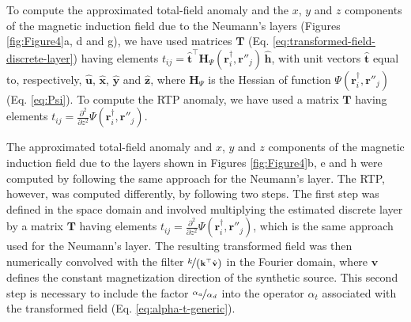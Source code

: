 To compute the approximated total-field anomaly and the $x$, $y$ and $z$ components of the magnetic induction field 
due to the Neumann's layers (Figures \ref{fig:Figure4}a, d and g), 
we have used matrices $\mathbf{T}$ (Eq. \ref{eq:transformed-field-discrete-layer}) 
having elements $t_{ij} = \hat{\mathbf{t}}^{\top} \mathbf{H}_{\Psi}(\mathbf{r}^{\dagger}_{i}, \mathbf{r}''_{j}) \, \hat{\mathbf{h}}$,
with unit vectors $\hat{\mathbf{t}}$ equal to, respectively, $\hat{\mathbf{u}}$, $\hat{\mathbf{x}}$, $\hat{\mathbf{y}}$ and
$\hat{\mathbf{z}}$, 
where $\mathbf{H}_{\Psi}$ is the Hessian of function $\Psi(\mathbf{r}^{\dagger}_{i}, \mathbf{r}''_{j})$
(Eq. \ref{eq:Psi}).
To compute the RTP anomaly, we have used a matrix $\mathbf{T}$ 
having elements $t_{ij} = \tfrac{\partial^{2}}{\partial z^{2}} \Psi(\mathbf{r}^{\dagger}_{i}, \mathbf{r}''_{j})$.

The approximated total-field anomaly and $x$, $y$ and $z$ components of the magnetic induction field 
due to the layers shown in Figures \ref{fig:Figure4}b, e and h were computed 
by following the same approach for the Neumann's layer. 
The RTP, however, was computed differently, by following two steps. 
The first step was defined in the space domain and involved multiplying the estimated discrete layer 
by a matrix $\mathbf{T}$ 
having elements $t_{ij} = \tfrac{\partial^{2}}{\partial z^{2}} \Psi(\mathbf{r}^{\dagger}_{i}, \mathbf{r}''_{j})$,
which is the same approach used for the Neumann's layer. 
The resulting transformed field was then numerically convolved with the filter $\nicefrac{k}{\left(\mathbf{k}^{\top} \hat{\mathbf{v}} \right)}$ 
in the Fourier domain, where $\mathbf{v}$ defines the constant magnetization direction of the synthetic source.
This second step is necessary to include the factor $\nicefrac{\alpha_{a}}{\alpha_{d}}$ into the operator 
$\alpha_{t}$ associated with the transformed field (Eq. \ref{eq:alpha-t-generic}).

